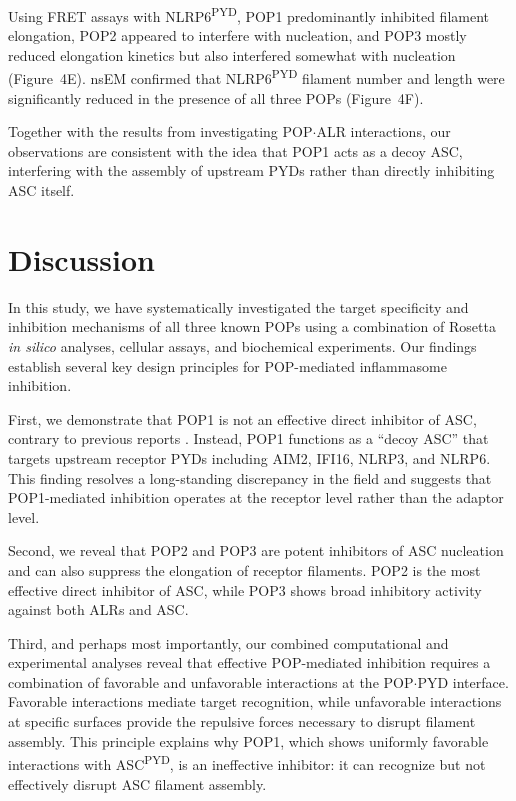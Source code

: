 \documentclass[11pt]{article}
\begin{document}
Using FRET assays with NLRP6\textsuperscript{PYD}, POP1 predominantly inhibited filament elongation, POP2 appeared to interfere with nucleation, and POP3 mostly reduced elongation kinetics but also interfered somewhat with nucleation (Figure~4E). nsEM confirmed that NLRP6\textsuperscript{PYD} filament number and length were significantly reduced in the presence of all three POPs (Figure~4F).

Together with the results from investigating POP$\cdot$ALR interactions, our observations are consistent with the idea that POP1 acts as a decoy ASC, interfering with the assembly of upstream PYDs rather than directly inhibiting ASC itself.

\section{Discussion}

In this study, we have systematically investigated the target specificity and inhibition mechanisms of all three known POPs using a combination of Rosetta \textit{in silico} analyses, cellular assays, and biochemical experiments. Our findings establish several key design principles for POP-mediated inflammasome inhibition.

First, we demonstrate that POP1 is not an effective direct inhibitor of ASC, contrary to previous reports \citep{dealmeida2015pop1}. Instead, POP1 functions as a ``decoy ASC'' that targets upstream receptor PYDs including AIM2, IFI16, NLRP3, and NLRP6. This finding resolves a long-standing discrepancy in the field and suggests that POP1-mediated inhibition operates at the receptor level rather than the adaptor level.

Second, we reveal that POP2 and POP3 are potent inhibitors of ASC nucleation and can also suppress the elongation of receptor filaments. POP2 is the most effective direct inhibitor of ASC, while POP3 shows broad inhibitory activity against both ALRs and ASC.

Third, and perhaps most importantly, our combined computational and experimental analyses reveal that effective POP-mediated inhibition requires a combination of favorable and unfavorable interactions at the POP$\cdot$PYD interface. Favorable interactions mediate target recognition, while unfavorable interactions at specific surfaces provide the repulsive forces necessary to disrupt filament assembly. This principle explains why POP1, which shows uniformly favorable interactions with ASC\textsuperscript{PYD}, is an ineffective inhibitor: it can recognize but not effectively disrupt ASC filament assembly.
\end{document}
